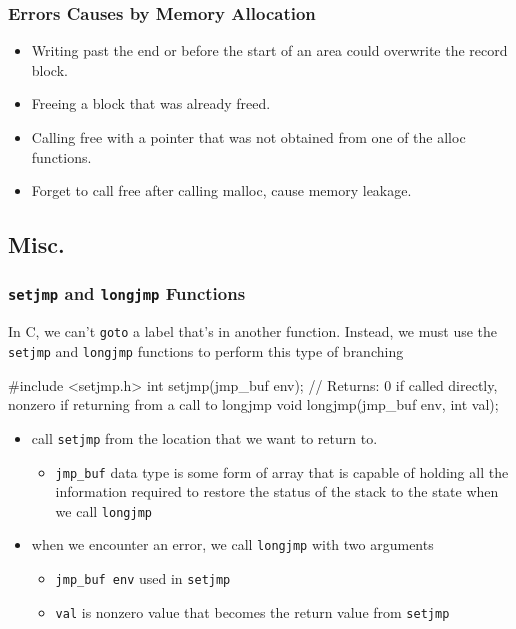 \documentclass[newPxFont,sthlmFooter,nooffset]{beamer}
\begin{document}
\begin{frame}[containsverbatim,t]
  \frametitle{Errors Causes by Memory Allocation}
\begin{itemize}
\item Writing past the end or before the start of an area could overwrite the record block.
\item Freeing a block that was already freed.
\item Calling free with a pointer that was not obtained from one of the alloc functions.
\item Forget to call free after calling malloc, cause memory leakage.
\end{itemize}
\end{frame}

\subsection{Misc.}

\begin{frame}[containsverbatim,t]
  \frametitle{\texttt{setjmp} and \texttt{longjmp} Functions}
In C, we can't \texttt{goto} a label that's in another function. Instead, we must use the \texttt{setjmp} and \texttt{longjmp} functions to perform this type of branching
\begin{codedef}
 #include <setjmp.h>
int setjmp(jmp_buf env);
// Returns: 0 if called directly, nonzero if returning from a call to longjmp
void longjmp(jmp_buf env, int val);
\end{codedef}
\begin{itemize}
\item call \texttt{setjmp} from the location that we want to return to.
  \begin{itemize}
  \item \texttt{jmp\_buf} data type is some form of array that is capable of holding all the information required to restore the status of the stack to the state when we call \texttt{longjmp}
  \end{itemize}
\item when we encounter an error, we call \texttt{longjmp} with two arguments
  \begin{itemize}
  \item \texttt{jmp\_buf env} used in \texttt{setjmp}
  \item \texttt{val} is nonzero value that becomes the return value from \texttt{setjmp}
  \end{itemize}
\end{itemize}
\end{frame}
\end{document}
